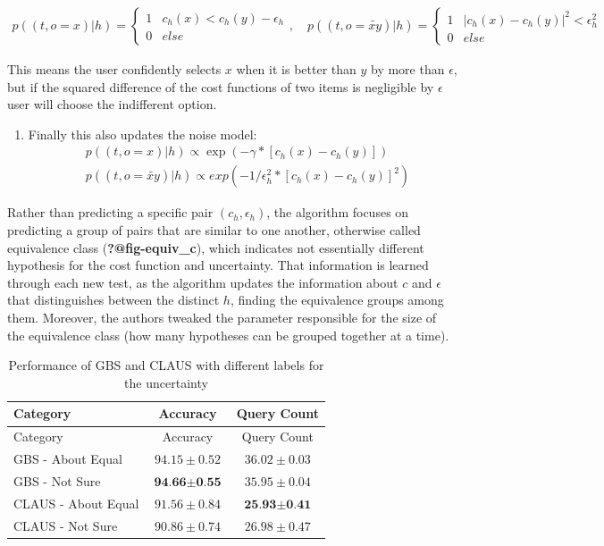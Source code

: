 \documentclass[
  letterpaper,
  numbers=noenddot,
  DIV=11]{scrreprt}
\providecommand{\tightlist}{%
  \setlength{\itemsep}{0pt}\setlength{\parskip}{0pt}}\usepackage{longtable,booktabs,array}
\theoremstyle{plain}
\theoremstyle{definition}
\theoremstyle{remark}
\begin{document}
\[\begin{aligned}
    p((t, o = x) | h) = 
    \begin{cases}
        1 & c_h(x) < c_h(y) - \epsilon_h\\
        0 & else
    \end{cases}, \quad
    p((t, o = \tilde{xy}) | h) = 
    \begin{cases}
        1 & |c_h(x) - c_h(y)|^2 < \epsilon_h^2\\
        0 & else
    \end{cases}
\end{aligned}\]

This means the user confidently selects \(x\) when it is better than
\(y\) by more than \(\epsilon\), but if the squared difference of the
cost functions of two items is negligible by \(\epsilon\) user will
choose the indifferent option.

\begin{enumerate}
\def\labelenumi{\arabic{enumi}.}
\setcounter{enumi}{2}
\tightlist
\item
  Finally this also updates the noise model: \[\begin{aligned}
  &p((t, o = x) | h) \propto \exp(-\gamma * [c_h(x) - c_h(y)]) \\
  &p((t, o = \tilde{xy}) | h) \propto exp(-1/\epsilon_h^2 * [c_h(x) - c_h(y)]^2)
  \end{aligned}\]
\end{enumerate}

Rather than predicting a specific pair \((c_h, \epsilon_h)\), the
algorithm focuses on predicting a group of pairs that are similar to one
another, otherwise called equivalence class (\textbf{?@fig-equiv\_c}),
which indicates not essentially different hypothesis for the cost
function and uncertainty. That information is learned through each new
test, as the algorithm updates the information about \(c\) and
\(\epsilon\) that distinguishes between the distinct \(h\), finding the
equivalence groups among them. Moreover, the authors tweaked the
parameter responsible for the size of the equivalence class (how many
hypotheses can be grouped together at a time).

\begin{longtable}[]{@{}lcc@{}}
\caption{Performance of GBS and CLAUS with different labels for the
uncertainty}\label{tbl-claus_tab}\tabularnewline
\toprule\noalign{}
Category & Accuracy & Query Count \\
\midrule\noalign{}
\endfirsthead
\toprule\noalign{}
Category & Accuracy & Query Count \\
\midrule\noalign{}
\endhead
\bottomrule\noalign{}
\endlastfoot
GBS - About Equal & \(94.15 \pm 0.52\) & \(36.02 \pm 0.03\) \\
GBS - Not Sure & \(\textbf{94.66} \pm \textbf{0.55}\) &
\(35.95 \pm 0.04\) \\
CLAUS - About Equal & \(91.56 \pm 0.84\) &
\(\textbf{25.93} \pm \textbf{0.41}\) \\
CLAUS - Not Sure & \(90.86 \pm 0.74\) & \(26.98 \pm 0.47\) \\
\end{longtable}
\end{document}
